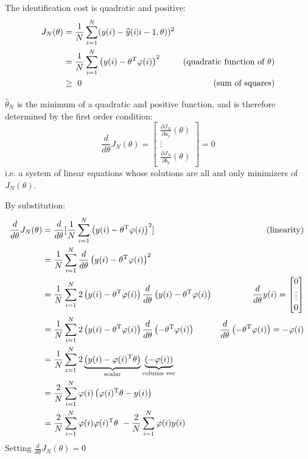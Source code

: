 The identification cost is quadratic and positive:		
\begin{align*}
J_{N}( \theta ) & =\frac{1}{N}\sum _{i=1}^{N}( y( i) -\widehat{y}( i|i-1,\theta ))^{2} & \\
 & =\frac{1}{N}\sum _{i=1}^{N}\left( y( i) -\theta ^{\mathrm{T}} \varphi ( i)\right)^{2} & (\text{quadratic function of} \ \theta) \\
 & \geq \ 0 & \text{(sum of squares)}
\end{align*}


$ \hat{\theta }_{N}$ is the minimum of a quadratic and positive function, and is therefore determined by the first order condition:
\begin{equation*}
\frac{d}{d\theta } J_{N}( \theta ) =\begin{bmatrix}
\frac{\partial J_{N}}{\partial a_{1}}( \theta )\\
\vdots \\
\frac{\partial J_{N}}{\partial b_{p}}( \theta )
\end{bmatrix} =0
\end{equation*}
i.e. a system of linear equations whose solutions are all and only minimizers of $ J_{N}( \theta )$.

By substitution:
\begin{equation*}
\begin{aligned}
\frac{d}{d\theta } J_{N}( \theta ) & =\frac{d}{d\theta }[\frac{1}{N}\sum _{i=1}^{N}\left( y( i) -\theta ^{\mathrm{T}} \varphi ( i)\right)^{2}] & \text{(linearity)}\\
 & =\frac{1}{N}\sum _{i=1}^{N}\frac{d}{d\theta }\left( y( i) -\theta ^{\mathrm{T}} \varphi ( i)\right)^{2} & \\
 & =\frac{1}{N}\sum _{i=1}^{N} 2\left( y( i) -\theta ^{\mathrm{T}} \varphi ( i)\right)\frac{d}{d\theta }\left( y( i) -\theta ^{\mathrm{T}} \varphi ( i)\right) & \frac{d}{d\theta } y( i) =\begin{bmatrix}
0\\
\vdots \\
0
\end{bmatrix}\\
 & =\frac{1}{N}\sum _{i=1}^{N} 2\left( y( i) -\theta ^{\mathrm{T}} \varphi ( i)\right)\frac{d}{d\theta }\left( -\theta ^{\mathrm{T}} \varphi ( i)\right) & \frac{d}{d\theta }\left( -\theta ^{\mathrm{T}} \varphi ( i)\right) =-\varphi ( i)\\
 & =\frac{1}{N}\sum _{i=1}^{N} 2\underbrace{\left( y( i) -\varphi ( i)^{\mathrm{T}} \theta \right)}_{\text{scalar}}\underbrace{( -\varphi ( i))}_{\text{column vec}} & \\
 & =\frac{2}{N}\sum _{i=1}^{N} \varphi ( i)\left( \varphi ( i)^{\mathrm{T}} \theta -y( i)\right) & \\
 & =\frac{2}{N}\sum _{i=1}^{N} \varphi ( i) \varphi ( i)^{\mathrm{T}} \theta \ -\frac{2}{N}\sum _{i=1}^{N} \varphi ( i) y( i) & 
\end{aligned} \ 
\end{equation*}
Setting $ \frac{d}{d\theta } J_{N}( \theta ) =0$	


